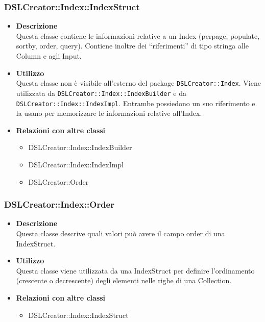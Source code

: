  \subsubsection{DSLCreator::Index::IndexStruct}
                    \begin{itemize}
                        \item \textbf{Descrizione} \hfill \\
                          Questa classe contiene le informazioni relative a un Index (perpage, populate, sortby, order, query). Contiene inoltre dei ``riferimenti'' di tipo stringa alle Column e agli Input.
                        \item \textbf{Utilizzo} \hfill \\
                          Questa classe non è visibile all'esterno del package \texttt{DSLCreator::Index}. Viene utilizzata da \texttt{DSLCreator::Index::IndexBuilder} e da \texttt{DSLCreator::Index::IndexImpl}. Entrambe possiedono un suo riferimento e la usano per memorizzare le informazioni relative all'Index.
                        \item \textbf{Relazioni con altre classi}
                            \begin{itemize}
                              \item DSLCreator::Index::IndexBuilder
                              \item DSLCreator::Index::IndexImpl
                              \item DSLCreator::Order
                            \end{itemize}
                    \end{itemize}

 \subsubsection{DSLCreator::Index::Order}
                    \begin{itemize}
                        \item \textbf{Descrizione} \hfill \\
                          Questa classe descrive quali valori può avere il campo order di una IndexStruct. 
                        \item \textbf{Utilizzo} \hfill \\
                          Questa classe viene utilizzata da una IndexStruct per definire l'ordinamento (crescente o decrescente) degli elementi nelle righe di una Collection.
                        \item \textbf{Relazioni con altre classi}
                            \begin{itemize}
                              \item DSLCreator::Index::IndexStruct
                            \end{itemize}
                    \end{itemize}


